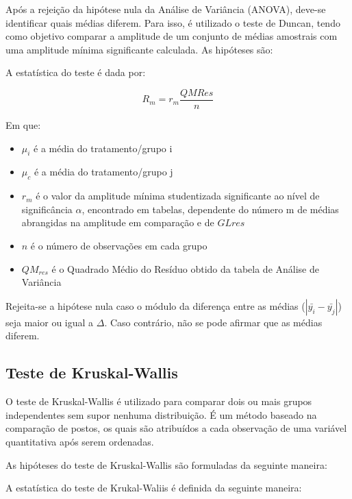 \documentclass[
]{estat/estat}
\begin{document}
Após a rejeição da hipótese nula da Análise de Variância (ANOVA),
deve-se identificar quais médias diferem. Para isso, é utilizado o teste
de Duncan, tendo como objetivo comparar a amplitude de um conjunto de
médias amostrais com uma amplitude mínima significante calculada. As
hipóteses são:


A estatística do teste é dada por:

\[R_m = r_m \frac{QMRes}{n}\]

Em que:

\begin{itemize}
\item
  \(\mu_i\) é a média do tratamento/grupo i
\item
  \(\mu_c\) é a média do tratamento/grupo j
\item
  \(r_m\) é o valor da amplitude mínima studentizada significante ao
  nível de significância \(\alpha\), encontrado em tabelas, dependente
  do número m de médias abrangidas na amplitude em comparação e de
  \(GLres\)
\item
  \(n\) é o número de observações em cada grupo
\item
  \(QM_{res}\) é o Quadrado Médio do Resíduo obtido da tabela de Análise
  de Variância
\end{itemize}

Rejeita-se a hipótese nula caso o módulo da diferença entre as médias
(\(|\bar{y_i} - \bar{y_j}|\)) seja maior ou igual a \(\Delta\). Caso
contrário, não se pode afirmar que as médias diferem.

\hypertarget{teste-de-kruskal-wallis}{%
\subsection{Teste de Kruskal-Wallis}\label{teste-de-kruskal-wallis}}

O teste de Kruskal-Wallis é utilizado para comparar dois ou mais grupos
independentes sem supor nenhuma distribuição. É um método baseado na
comparação de postos, os quais são atribuídos a cada observação de uma
variável quantitativa após serem ordenadas.

As hipóteses do teste de Kruskal-Wallis são formuladas da seguinte
maneira:


A estatística do teste de Krukal-Waliis é definida da seguinte maneira:
\end{document}
